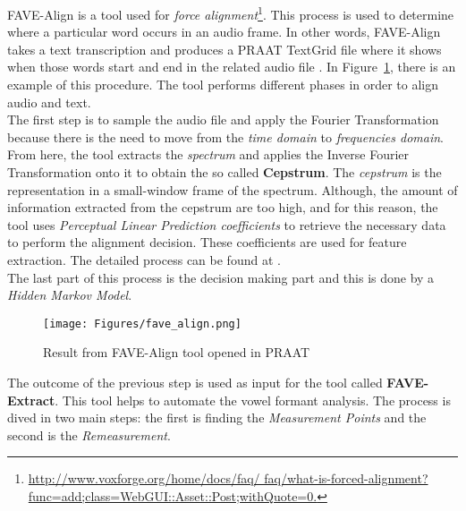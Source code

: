 \noindent FAVE-Align is a tool used for \textit{force alignment}\footnote{\url{http://www.voxforge.org/home/docs/faq/ faq/what-is-forced-alignment?func=add;class=WebGUI::Asset::Post;withQuote=0.}}. This process is used to determine where a particular word occurs in an audio frame. In other words, FAVE-Align takes a text transcription and produces a PRAAT TextGrid file where it shows when those words start and end in the related audio file \cite{weik2012communications}. In Figure~\ref{fig:fave-align_result}, there is an example of this procedure. The tool performs different phases in order to align audio and text.\\

\noindent The first step is to sample the audio file and apply the Fourier Transformation because there is the need to move from the \textit{time domain} to \textit{frequencies domain}. From here, the tool extracts the \textit{spectrum} and applies the Inverse Fourier Transformation onto it to obtain the so called \textbf{Cepstrum}. The \textit{cepstrum} is the representation in a small-window frame of the spectrum. Although, the amount of information extracted from the cepstrum are too high, and for this reason, the tool uses \textit{Perceptual Linear Prediction coefficients} to retrieve the necessary data to perform the alignment decision. These coefficients are used for feature extraction. The detailed process can be found at \cite{hermansky1990perceptual}. \\
The last part of this process is the decision making part and this is done by a \textit{Hidden Markov Model}. \\

\begin{figure}[!ht]
	\centering
	\texttt{[image: Figures/fave\_align.png]}
	\caption{Result from FAVE-Align tool opened in PRAAT}
	\label{fig:fave-align_result}
\end{figure}

\noindent The outcome of the previous step is used as input for the tool called \textbf{FAVE-Extract}. This tool helps to automate the vowel formant analysis. The process is dived in two main steps: the first is finding the \textit{Measurement Points} and the second is the \textit{Remeasurement}. \\

